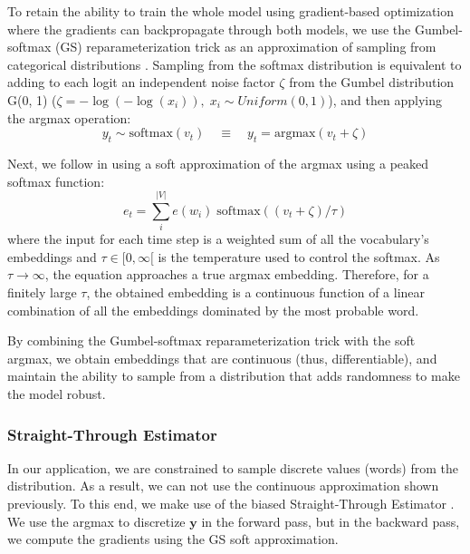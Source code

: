 To retain the ability to train the whole model using gradient-based optimization where the gradients can backpropagate through both models, we use the Gumbel-softmax (GS) reparameterization trick as an approximation of sampling from categorical distributions \citep{jang2016categorical}. Sampling from the softmax distribution is equivalent to adding to each logit an independent noise factor $\zeta$ from the Gumbel distribution G(0, 1) ($\zeta = -\log(-\log(x_i)), \; x_i \sim Uniform(0, 1) $), and then applying the argmax operation:
\[ y_t \sim \text{softmax}(v_t) \quad \equiv \quad y_t = \text{argmax}(v_t + \zeta) \]

Next, we follow \citep{goyal2017differentiable} in using a soft approximation of the argmax using a peaked softmax function:
\[ e_t = \sum_{i}^{|V|} e(w_i) \; \text{softmax}((v_t + \zeta) / \tau ) \]
where the input for each time step is a weighted sum of all the vocabulary's embeddings and $\tau \in [0, \infty[$ is the temperature used to control the softmax. As $\tau \rightarrow \infty$, the equation approaches a true argmax embedding. Therefore, for a finitely large $\tau$, the obtained embedding is a continuous function of a linear combination of all the embeddings dominated by the most probable word.

By combining the Gumbel-softmax reparameterization trick with the soft argmax, we obtain embeddings that are continuous (thus, differentiable), and maintain the ability to sample from a distribution that adds randomness to make the model robust.

\subsubsection{Straight-Through Estimator}

In our application, we are constrained to sample discrete values (words) from the distribution. As a result, we can not use the continuous approximation shown previously. To this end, we make use of the biased Straight-Through Estimator \citep{bengio2013estimating}. We use the argmax to discretize $\mathbf{y}$ in the forward pass, but in the backward pass, we compute the gradients using the GS soft approximation.




